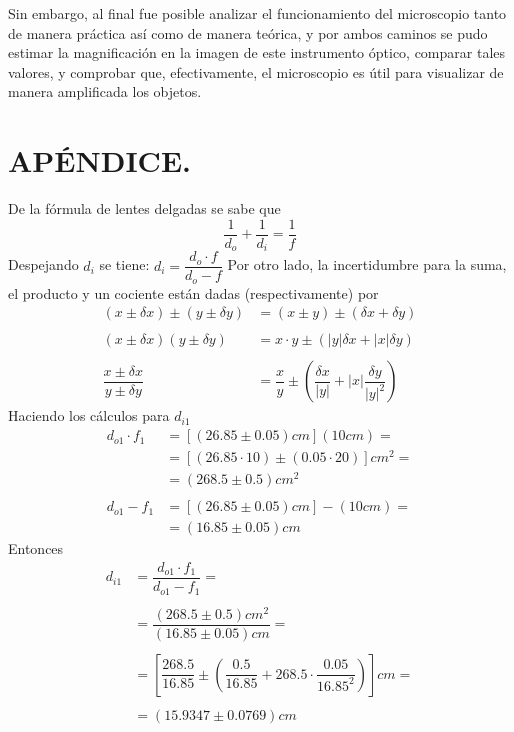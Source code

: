 \documentclass[10pt,a4paper]{article}
\begin{document}
Sin embargo, al final fue posible analizar el funcionamiento del microscopio tanto de manera práctica así como de manera teórica, y por ambos caminos se pudo estimar la magnificación en la imagen de este instrumento óptico, comparar tales valores, y comprobar que, efectivamente, el microscopio es útil para visualizar de manera amplificada los objetos. 




\section{APÉNDICE.} %
\label{sec:apendice}
De la fórmula de lentes delgadas se sabe que 
$$\dfrac{1}{d_o}+\dfrac{1}{d_i}=\dfrac{1}{f}$$
Despejando $ d_i $ se tiene: \hspace{0.4cm} $d_i=\dfrac{d_o\cdot f}{d_o-f}$
Por otro lado, la incertidumbre para la suma, el producto y un cociente están dadas (respectivamente) por
\begin{align*}
	(x\pm \delta x)\pm(y\pm \delta y)&=(x\pm y)\pm(\delta x+\delta y)\\\\
	(x\pm\delta x)(y\pm\delta y)&=x\cdot y\pm\left(|y|\delta x+|x|\delta y \right)\\\\
	\dfrac{x\pm\delta x}{y\pm\delta y}&=\dfrac{x}{y}\pm\left(\dfrac{\delta x}{|y|}+|x|\dfrac{\delta y}{|y|^2}\right)
\end{align*}
Haciendo los cálculos para $ d_{i1} $
\begin{align*}
	d_{o1}\cdot f_1&=[(26.85\pm 0.05)cm](10cm)=\\	&=[(26.85\cdot10)\pm(0.05\cdot20)]cm^2=\\
	&=(268.5\pm0.5)cm^2\\\\
	d_{o1}-f_1&=[(26.85\pm 0.05)cm]-(10cm)=\\
	&=(16.85\pm0.05) cm
\end{align*}
Entonces
\begin{align*}
	d_{i1}&=\dfrac{d_{o1}\cdot f_1}{d_{o1}-f_1}=\\\\
	&=\dfrac{(268.5\pm0.5)cm^2}{(16.85\pm0.05) cm}=\\\\
	&=\left[\dfrac{268.5}{16.85}\pm\left(\dfrac{0.5}{16.85}+
	268.5\cdot\dfrac{0.05}{16.85^2}\right)\right]cm=\\\\
	&=(15.9347\pm0.0769)cm
\end{align*}
\end{document}
